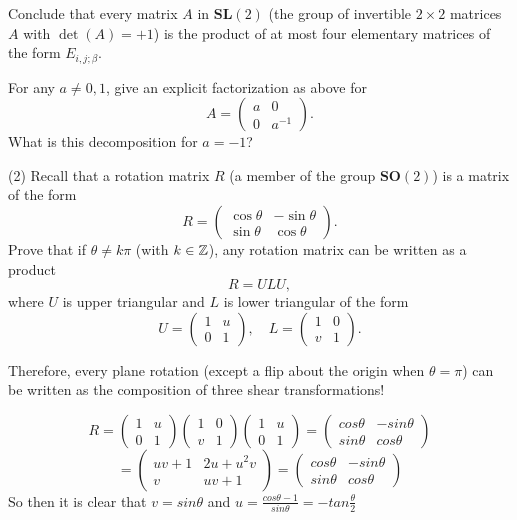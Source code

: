 \documentclass[12pt]{article}
\begin{document}
\medskip
Conclude that every matrix $A$ in $\mathbf{SL}(2)$ 
(the group of invertible $2\times 2$ matrices $A$ with
$\det(A) = +1$)  is the product of
at most four elementary matrices
of the form $E_{i, j; \beta}$.

\medskip
For any $a\not= 0, 1$, give an explicit factorization as above for
\[
A = 
\begin{pmatrix}
a & 0 \\
0 & a^{-1}
\end{pmatrix}.
\]
What is this decomposition for $a = -1$?

\medskip
(2)
Recall that a rotation matrix $R$ (a member of the group
$\mathbf{SO}(2)$)  is a matrix of the form
\[
R = 
\begin{pmatrix}
\cos\theta & -\sin\theta \\
\sin\theta & \cos\theta
\end{pmatrix}.
\]
Prove that if $\theta \not= k \pi$ (with $k \in {\mathbb Z}$), 
any rotation matrix can be written as a product 
\[
R = U L U,
\] 
where $U$ is upper triangular and $L$ is lower triangular 
of the form
\[
U = 
\begin{pmatrix}
1 & u \\
0 & 1
\end{pmatrix},
\quad
L = 
\begin{pmatrix}
1 & 0 \\
v & 1
\end{pmatrix}.
\]

\medskip
Therefore, every plane rotation (except a flip about the origin when 
$\theta = \pi$) can be written as the composition of three
shear transformations!

$$R = \begin{pmatrix}
1 & u \\ 0 & 1
\end{pmatrix} \begin{pmatrix}
1 & 0 \\ v & 1
\end{pmatrix}\begin{pmatrix}
1 & u \\ 0 & 1
\end{pmatrix} = \begin{pmatrix}
cos \theta & -sin \theta \\ sin \theta & cos \theta
\end{pmatrix}$$
$$ = \begin{pmatrix}
uv +1 & 2u + u^2v \\ v & uv +1
\end{pmatrix}= \begin{pmatrix}
cos \theta & -sin \theta \\ sin \theta & cos \theta
\end{pmatrix}$$
So then it is clear that $v = sin\theta$ and $u = \frac{cos\theta - 1}{sin \theta} = -tan \frac{\theta}{2}$
\end{document}
